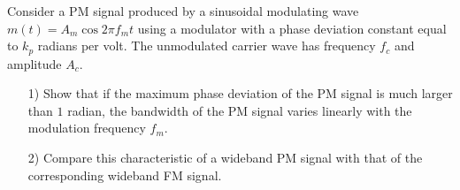 \documentclass{assignment}
\begin{document}
\begin{prob}
    Consider a PM signal produced by a sinusoidal modulating wave $m(t)=A_m\cos 2\pi f_mt$ using a modulator with a phase deviation constant equal to $k_p$ radians per volt. The unmodulated carrier wave has frequency $f_c$ and amplitude $A_c$.
    \begin{itemize}
        \item[1)] Show that if the maximum phase deviation of the PM signal is much larger than $1$ radian, the bandwidth of the PM signal varies linearly with the modulation frequency $f_m$.
        \item[2)] Compare this characteristic of a wideband PM signal with that of the corresponding wideband FM signal.
    \end{itemize}
\end{prob}
\end{document}

